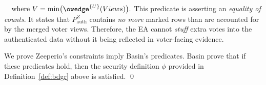 $\quad\text{where }V=\min\bigl(\owedge^{\{U\}}(Views)\bigr).$ This predicate is asserting an \emph{equality of counts}.
It states that $P_{\mathrm{auth}}^{Z}$ contains \emph{no more} marked rows than are accounted for by the merged voter views. 
Therefore, the EA cannot \emph{stuff} extra votes into the authenticated data without it being reflected in voter-facing evidence.



We prove Zeeperio's constraints imply Basin's predicates. Basin \etal prove that if these predicates hold, then the security definition $\phi$ provided in Definition~\ref{def:bdgr} above is satisfied. \qed


